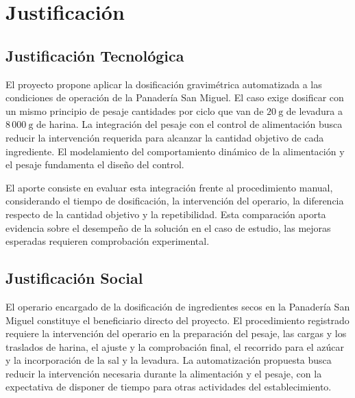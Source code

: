 
\section{Justificación}
\label{sec:justificacion}

\subsection{Justificación Tecnológica}
\label{subsec:justificacion_tecnologica}

El proyecto propone aplicar la dosificación gravimétrica automatizada
a las condiciones de operación de la Panadería San Miguel. El caso exige
dosificar con un mismo principio de pesaje cantidades por ciclo que van
de $20\ \mathrm{g}$ de levadura a $8\,000\ \mathrm{g}$ de harina. La
integración del pesaje con el control de alimentación busca reducir la
intervención requerida para alcanzar la cantidad objetivo de cada
ingrediente. El modelamiento del comportamiento dinámico de la
alimentación y el pesaje fundamenta el diseño del control.

El aporte consiste en evaluar esta integración frente al procedimiento
manual, considerando el tiempo de dosificación, la intervención del
operario, la diferencia respecto de la cantidad objetivo y la
repetibilidad. Esta comparación aporta evidencia sobre el desempeño de
la solución en el caso de estudio, las mejoras esperadas requieren
comprobación experimental.

\subsection{Justificación Social}
\label{subsec:justificacion_social}

El operario encargado de la dosificación de ingredientes secos en la
Panadería San Miguel constituye el beneficiario directo del proyecto. El
procedimiento registrado requiere la intervención del operario en la
preparación del pesaje, las cargas y los traslados de harina, el ajuste y
la comprobación final, el recorrido para el azúcar y la incorporación de
la sal y la levadura. La automatización propuesta busca reducir la
intervención necesaria durante la alimentación y el pesaje, con la
expectativa de disponer de tiempo para otras actividades del
establecimiento.

